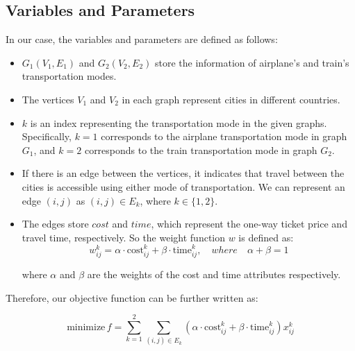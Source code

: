\documentclass[11pt]{extarticle}
\begin{document}
\subsection*{Variables and Parameters}
In our case, the variables and parameters are defined as follows:
\begin{itemize}
  \item $G_1(V_1, E_1)$ and $G_2(V_2, E_2)$ store the information of airplane's and train's transportation modes.
  \item The vertices $V_1$ and $V_2$ in each graph represent cities in different
        countries.
  \item $k$ is an index representing the transportation mode in the given graphs. Specifically, $k = 1$ corresponds to the airplane transportation mode in graph $G_1$, and $k = 2$ corresponds to the train transportation mode in graph $G_2$.
  \item If there is an edge between the vertices, it indicates that travel between the
        cities is accessible using either mode of transportation. We can represent an
        edge $(i, j)$ as $(i, j) \in E_k$, where $k \in \{1, 2\}$.
  \item The edges store $cost$ and $time$, which represent the one-way ticket price and
        travel time, respectively. So the weight function $w$ is defined as:
        \begin{equation*}
          w_{ij}^k = \alpha \cdot \text{cost}_{ij}^k + \beta \cdot \text{time}_{ij}^k, \quad where \quad \alpha + \beta = 1
        \end{equation*}

        where $\alpha$ and $\beta$ are the weights of the cost and time attributes
        respectively.

\end{itemize}
Therefore, our objective function can be further written as:

\begin{equation*}
  \text{minimize}\, f = \sum_{k=1}^{2} \sum_{(i,j) \in E_k} (\alpha \cdot \text{cost}_{ij}^k + \beta \cdot \text{time}_{ij}^k) x_{ij}^k
\end{equation*}
\end{document}
